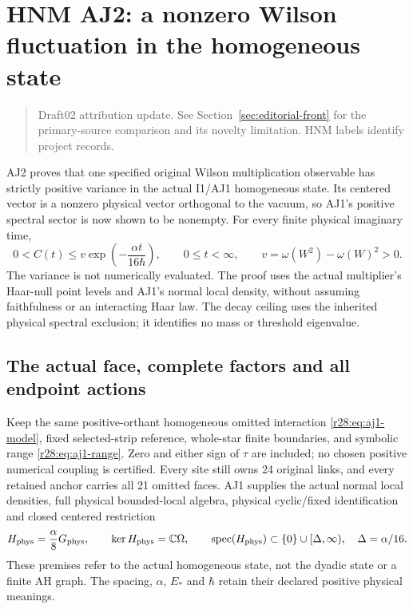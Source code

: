 \section{HNM AJ2: a nonzero Wilson fluctuation in the homogeneous state\workstar}
\begin{quote}\small Draft02 attribution update. See Section~\ref{sec:editorial-front} for the primary-source comparison and its novelty limitation. HNM labels identify project records.\end{quote}
\label{r28:sec:aj2}
AJ2 proves that one specified original Wilson multiplication observable has strictly positive variance in the actual I1/AJ1 homogeneous state. Its centered vector is a nonzero physical vector orthogonal to the vacuum, so AJ1's positive spectral sector is now shown to be nonempty. For every finite physical imaginary time,
\begin{equation}
 0<C(t)\le v\exp\!\left(-\frac{\alpha t}{16\hbar}\right),
 \qquad0\le t<\infty,
 \qquad v=\omega(W^2)-\omega(W)^2>0.
 \label{r28:eq:aj2-correlation}
\end{equation}
The variance is not numerically evaluated. The proof uses the actual multiplier's Haar-null point levels and AJ1's normal local density, without assuming faithfulness or an interacting Haar law. The decay ceiling uses the inherited physical spectral exclusion; it identifies no mass or threshold eigenvalue.

\subsection{The actual face, complete factors and all endpoint actions}
Keep the same positive-orthant homogeneous omitted interaction \eqref{r28:eq:aj1-model}, fixed selected-strip reference, whole-star finite boundaries, and symbolic range \eqref{r28:eq:aj1-range}. Zero and either sign of $\tau$ are included; no chosen positive numerical coupling is certified. Every site still owns 24 original links, and every retained anchor carries all 21 omitted faces. AJ1 supplies the actual normal local densities, full physical bounded-local algebra, physical cyclic/fixed identification and closed centered restriction
\begin{equation}
 H_{\rm phys}=\frac\alpha8G_{\rm phys},\qquad
 \ker H_{\rm phys}=\mathbb C\Omega,\qquad
 \operatorname{spec}(H_{\rm phys})\subset\{0\}\cup[\Delta,\infty),
 \quad\Delta=\alpha/16.
 \label{r28:eq:aj2-inherited}
\end{equation}
These premises refer to the actual homogeneous state, not the dyadic state or a finite AH graph. The spacing, $\alpha$, $E_*$ and $\hbar$ retain their declared positive physical meanings.


